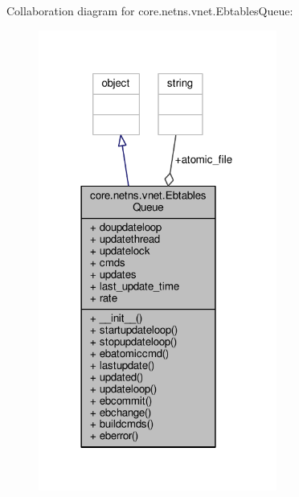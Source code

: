 Collaboration diagram for core.\+netns.\+vnet.\+Ebtables\+Queue\+:
\nopagebreak
\begin{figure}[H]
\begin{center}
\leavevmode
\includegraphics[width=222pt]{classcore_1_1netns_1_1vnet_1_1_ebtables_queue__coll__graph}
\end{center}
\end{figure}
